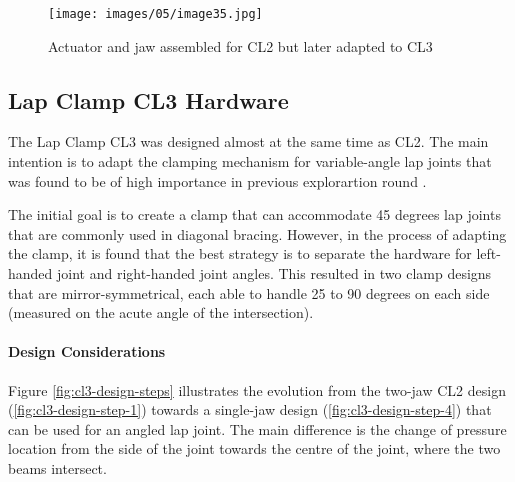 \begin{figure}
    \centering
    \texttt{[image: images/05/image35.jpg]}
    \caption{Actuator and jaw assembled for CL2 but later adapted to CL3}
    \label{fig:cl2-construction-photo}
\end{figure}

\subsection{Lap Clamp CL3 Hardware}
\label{subsection:exploration-2-lap-clamp-cl3-hardware}

The Lap Clamp CL3 was designed almost at the same time as CL2. The main intention is to adapt the clamping mechanism for variable-angle lap joints that was found to be of high importance in previous explorartion round . 

The initial goal is to create a clamp that can accommodate 45 degrees lap joints that are commonly used in diagonal bracing. However, in the process of adapting the clamp, it is found that the best strategy is to separate the hardware for left-handed joint and right-handed joint angles. This resulted in two clamp designs that are mirror-symmetrical, each able to handle 25 to 90 degrees on each side (measured on the acute angle of the intersection). 

\paragraph{Design Considerations}

Figure \ref{fig:cl3-design-steps} illustrates the evolution from the two-jaw CL2 design (\ref{fig:cl3-design-step-1}) towards a single-jaw design (\ref{fig:cl3-design-step-4}) that can be used for an angled lap joint. The main difference is the change of pressure location from the side of the joint towards the centre of the joint, where the two beams intersect.

